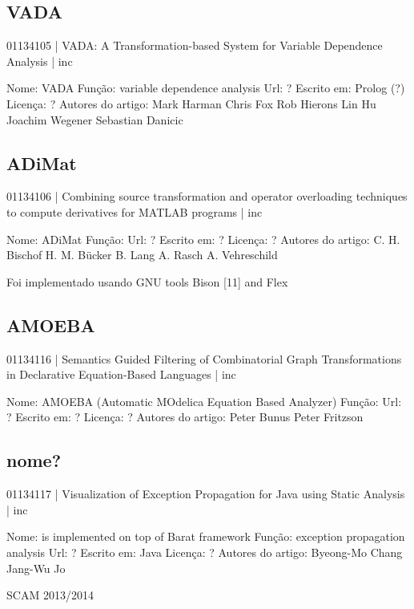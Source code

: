 \subsection{VADA}

01134105 | VADA: A Transformation-based System for Variable Dependence Analysis | inc

Nome: VADA
Função: variable dependence analysis
Url: ?
Escrito em: Prolog (?)
Licença: ?
Autores do artigo: Mark Harman
                   Chris Fox
                   Rob Hierons
                   Lin Hu
                   Joachim Wegener
                   Sebastian Danicic

\subsection{ADiMat}

01134106 | Combining source transformation and operator overloading techniques to compute derivatives for MATLAB programs | inc

Nome: ADiMat
Função: 
Url: ?
Escrito em: ?
Licença: ?
Autores do artigo: C. H. Bischof
                   H. M. Bücker
                   B. Lang
                   A. Rasch
                   A. Vehreschild

Foi implementado usando GNU tools Bison [11] and Flex

\subsection{AMOEBA}

01134116 | Semantics Guided Filtering of Combinatorial Graph Transformations in Declarative Equation-Based Languages | inc

Nome: AMOEBA (Automatic MOdelica Equation Based Analyzer)
Função: 
Url: ?
Escrito em: ?
Licença: ?
Autores do artigo: Peter Bunus
                   Peter Fritzson


\subsection{nome?}

01134117 | Visualization of Exception Propagation for Java using Static Analysis | inc

Nome: is implemented on top of Barat framework
Função: exception propagation analysis 
Url: ?
Escrito em: Java 
Licença: ?
Autores do artigo: Byeong-Mo Chang
                   Jang-Wu Jo

SCAM 2013/2014

